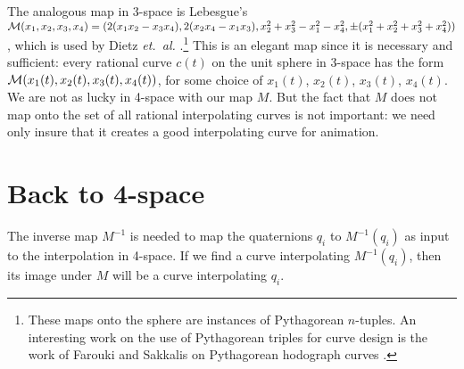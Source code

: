 The analogous map in 3-space is Lebesgue's
$ {\cal M}(x_1,x_2,x_3,x_4) = 
(2(x_1x_2-x_3x_4), 2(x_2x_4-x_1x_3),
x_2^2 + x_3^2 - x_1^2 - x_4^2,\pm(x_1^2 + x_2^2 + x_3^2 + x_4^2))$
\cite{dickson52,dietz93}, which is used by Dietz {\em et.\ al.}
\cite{dietz93}.\footnote{These maps onto the sphere are 
	instances of Pythagorean $n$-tuples.  An interesting work
	on the use of Pythagorean triples for curve design
	is the work of Farouki and Sakkalis on Pythagorean hodograph curves
	\cite{farouki90}.}
This is an elegant map since it is necessary and sufficient: 
every rational curve $c(t)$
on the unit sphere in 3-space has the form
${\cal M}(x_1(t),x_2(t),x_3(t),x_4(t))$,
for some choice of $x_1(t)$, $x_2(t)$, $x_3(t)$, $x_4(t)$.
We are not as lucky in 4-space with our map $M$.
But the fact that $M$ does not map onto the set of all rational 
interpolating curves is not important: we need only insure that it
creates a good interpolating curve for animation.


\section{Back to 4-space}
\label{sec:invM}

The inverse map $M^{-1}$ is needed
to map the quaternions $q_i$ to $M^{-1}(q_i)$ as input to the
interpolation in 4-space.
If we find a curve interpolating $M^{-1}(q_i)$,
then its image under $M$ will be a curve interpolating $q_i$.

\clearpage

